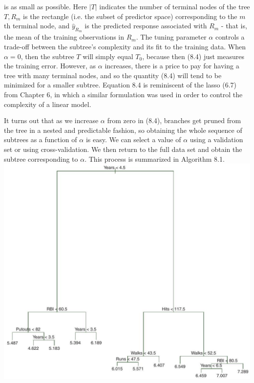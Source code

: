 \documentclass[10pt]{article}
\begin{document}
is as small as possible. Here $|T|$ indicates the number of terminal nodes of the tree $T, R_{m}$ is the rectangle (i.e. the subset of predictor space) corresponding to the $m$ th terminal node, and $\hat{y}_{R_{m}}$ is the predicted response associated with $R_{m}$ - that is, the mean of the training observations in $R_{m}$. The tuning parameter $\alpha$ controls a trade-off between the subtree's complexity and its fit to the training data. When $\alpha=0$, then the subtree $T$ will simply equal $T_{0}$, because then (8.4) just measures the training error. However, as $\alpha$ increases, there is a price to pay for having a tree with many terminal nodes, and so the quantity (8.4) will tend to be minimized for a smaller subtree. Equation 8.4 is reminiscent of the lasso (6.7) from Chapter 6, in which a similar formulation was used in order to control the complexity of a linear model.

It turns out that as we increase $\alpha$ from zero in (8.4), branches get pruned from the tree in a nested and predictable fashion, so obtaining the whole sequence of subtrees as a function of $\alpha$ is easy. We can select a value of $\alpha$ using a validation set or using cross-validation. We then return to the full data set and obtain the subtree corresponding to $\alpha$. This process is summarized in Algorithm 8.1.\\
\includegraphics[max width=\textwidth, center]{2025_05_05_efe77898333945044de4g-325}
\end{document}
